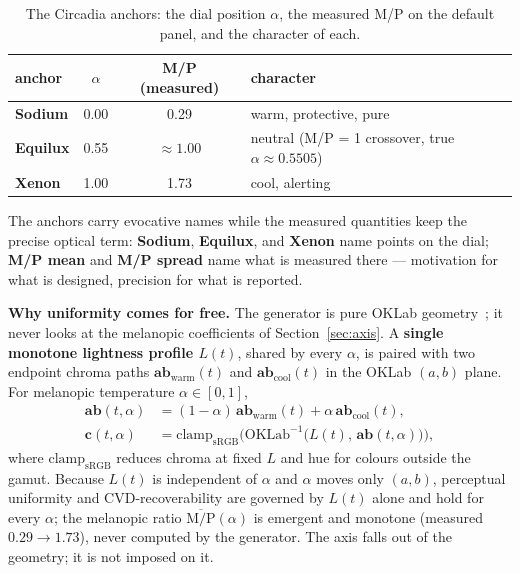\documentclass[10pt,a4paper,twocolumn]{article}
\begin{document}
\begin{table}[t]
    \centering
    \caption{The Circadia anchors: the dial position $\alpha$, the measured M/P on the default panel, and the character of each.}\label{tab:anchors}
    \begin{tabular}{lccl}
        \toprule
        anchor & $\alpha$ & M/P (measured) & character \\
        \midrule
        \textbf{Sodium} & 0.00 & 0.29 & warm, protective, pure \\
        \textbf{Equilux} & 0.55 & $\approx 1.00$ & neutral (M/P = 1 crossover, true $\alpha \approx 0.5505$) \\
        \textbf{Xenon} & 1.00 & 1.73 & cool, alerting \\
        \bottomrule
    \end{tabular}
\end{table}

The anchors carry evocative names while the measured quantities keep the precise optical term: \textbf{Sodium}, \textbf{Equilux}, and \textbf{Xenon} name points on the dial; \textbf{M/P mean} and \textbf{M/P spread} name what is measured there --- motivation for what is designed, precision for what is reported.

\par
\textbf{Why uniformity comes for free.}
The generator is pure OKLab geometry~\cite{ottosson2020oklab}; it never looks at the melanopic coefficients of Section~\ref{sec:axis}.
A \textbf{single monotone lightness profile $L(t)$}, shared by every $\alpha$, is paired with two endpoint chroma paths $\mathbf{ab}_{\mathrm{warm}}(t)$ and $\mathbf{ab}_{\mathrm{cool}}(t)$ in the OKLab $(a,b)$ plane.
For melanopic temperature $\alpha\in[0,1]$,
\begin{align}
  \mathbf{ab}(t,\alpha) &= (1-\alpha)\,\mathbf{ab}_{\mathrm{warm}}(t)
                          + \alpha\,\mathbf{ab}_{\mathrm{cool}}(t), \label{eq:morph}\\
  \mathbf{c}(t,\alpha) &= \mathrm{clamp}_{\mathrm{sRGB}}\!\bigl(
                          \mathrm{OKLab}^{-1}\!\bigl(L(t),\,\mathbf{ab}(t,\alpha)\bigr)\bigr),
                          \label{eq:gen}
\end{align}
where $\mathrm{clamp}_{\mathrm{sRGB}}$ reduces chroma at fixed $L$ and hue for colours outside the gamut.
Because $L(t)$ is independent of $\alpha$ and $\alpha$ moves only $(a,b)$, perceptual uniformity and CVD-recoverability are governed by $L(t)$ alone and hold for every $\alpha$; the melanopic ratio $\overline{\mathrm{M/P}}(\alpha)$ is emergent and monotone (measured $0.29\to 1.73$), never computed by the generator.
The axis falls out of the geometry; it is not imposed on it.
\end{document}
